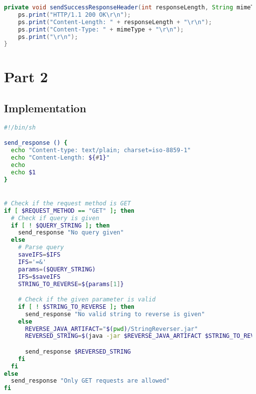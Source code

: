 \begin{lstlisting}[label=lst:01_part1_impl_tinyhttpd_sendSuccessResponseHeader, caption=CLI command to start a GitLab runner in a Docker container, language=java, numbers=none]
private void sendSuccessResponseHeader(int responseLength, String mimeType) {
    ps.print("HTTP/1.1 200 OK\r\n");
    ps.print("Content-Length: " + responseLength + "\r\n");
    ps.print("Content-Type: " + mimeType + "\r\n");
    ps.print("\r\n");
}
\end{lstlisting}

\section{Part 2}

\subsection{Implementation}

\begin{lstlisting}[label=lst:02_part2_impl_script, caption=CLI command to start a GitLab runner in a Docker container, language=bash, numbers=none]
#!/bin/sh

send_response () {
  echo "Content-type: text/plain; charset=iso-8859-1"
  echo "Content-Length: ${#1}"
  echo
  echo $1
}


# Check if the request method is GET
if [ $REQUEST_METHOD == "GET" ]; then
  # Check if query is given
  if [ ! $QUERY_STRING ]; then
    send_response "No query given"
  else
    # Parse query
    saveIFS=$IFS
    IFS='=&'
    params=($QUERY_STRING)
    IFS=$saveIFS
    STRING_TO_REVERSE=${params[1]}

    # Check if the given parameter is valid
    if [ ! $STRING_TO_REVERSE ]; then
      send_response "No valid string to reverse is given"
    else
      REVERSE_JAVA_ARTIFACT="$(pwd)/StringReverser.jar"
      REVERSED_STRING=$(java -jar $REVERSE_JAVA_ARTIFACT $STRING_TO_REVERSE)

      send_response $REVERSED_STRING
    fi
  fi
else
  send_response "Only GET requests are allowed"
fi
\end{lstlisting}
